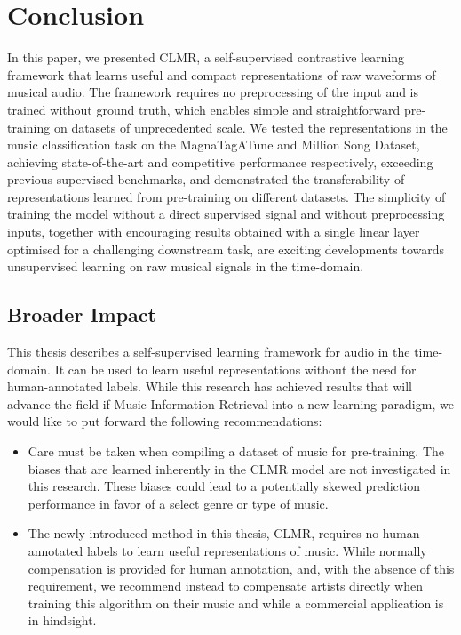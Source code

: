 \chapter{Conclusion}\label{sec:conclusion}
In this paper, we presented CLMR, a self-supervised contrastive learning framework that learns useful and compact representations of raw waveforms of musical audio.
The framework requires no preprocessing of the input and is trained without ground truth, which enables simple and straightforward pre-training on datasets of unprecedented scale.
We tested the representations in the music classification task on the MagnaTagATune and Million Song Dataset, achieving state-of-the-art and competitive performance respectively, exceeding previous supervised benchmarks, and demonstrated the transferability of representations learned from pre-training on different datasets.
The simplicity of training the model without a direct supervised signal and without preprocessing inputs, together with encouraging results obtained with a single linear layer optimised for a challenging downstream task, are exciting developments towards unsupervised learning on raw musical signals in the time-domain.

\section*{Broader Impact}
This thesis describes a self-supervised learning framework for audio in the time-domain.
It can be used to learn useful representations without the need for human-annotated labels.
While this research has achieved results that will advance the field if Music Information Retrieval into a new learning paradigm, we would like to put forward the following recommendations:

\begin{itemize}
    \item Care must be taken when compiling a dataset of music for pre-training. The biases that are learned inherently in the CLMR model are not investigated in this research. These biases could lead to a potentially skewed prediction performance in favor of a select genre or type of music.
    \item The newly introduced method in this thesis, CLMR, requires no human-annotated labels to learn useful representations of music. While normally compensation is provided for human annotation, and, with the absence of this requirement, we recommend instead to compensate artists directly when training this algorithm on their music and while a commercial application is in hindsight.
\end{itemize}